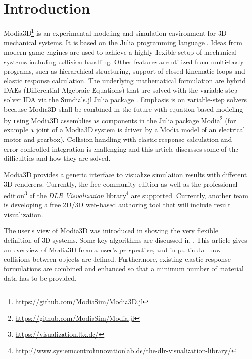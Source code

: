 \section{Introduction}

Modia3D\footnote{\href{https://github.com/ModiaSim/Modia3D.jl}{https://github.com/ModiaSim/Modia3D.jl}} is an experimental modeling and simulation environment for 3D mechanical systems. It is based on the Julia programming language \cite{bezanson2017julia}.
Ideas from modern game engines are used to achieve a highly flexible setup of mechanical
systems including collision handling. Other features are utilized from multi-body programs, 
such as hierarchical structuring, support of closed kinematic loops and elastic response calculation.
The underlying mathematical formulation are hybrid DAEs (Differential Algebraic Equations) that are solved with the variable-step solver IDA via the Sundials.jl Julia package \cite{Sundials2005,Rackauckas2017}.
Emphasis is on variable-step solvers because Modia3D shall be combined in the future with 
equation-based modeling by using Modia3D assemblies as components in the Julia package
Modia\footnote{\href{https://github.com/ModiaSim/Modia.jl}{https://github.com/ModiaSim/Modia.jl}} \cite{Modia1,Modia2}
(for example a joint of a Modia3D system is driven by a Modia model of an 
electrical motor and gearbox).
Collision handling with elastic response calculation and error controlled integration
is challenging and this article discusses some of the difficulties and how they are solved.

Modia3D provides a generic interface to visualize simulation results with different 3D renderers. Currently, the free community edition as well as the professional edition\footnote{\href{https://visualization.ltx.de/}{https://visualization.ltx.de/}} of the
\emph{DLR Visualization}  library\footnote{\href{http://www.systemcontrolinnovationlab.de/the-dlr-visualization-library/}{http://www.systemcontrolinnovationlab.de/the-dlr-visualization-library/}} \cite{bellmann2009, hellerer2014} are supported. Currently, another team is developing a free 2D/3D web-based authoring tool that will include result visualization.

The user's view of Modia3D was introduced in \cite{Neumayr2018} showing the very flexible definition of 3D systems.
Some key algorithms are discussed in \cite{Neumayr2017,Neumayr2019}. This article gives an overview of Modia3D from a user's perspective, and in particular how collisions between objects are defined. Furthermore, existing elastic response formulations are combined and enhanced so that a minimum number of material data has to be provided.
